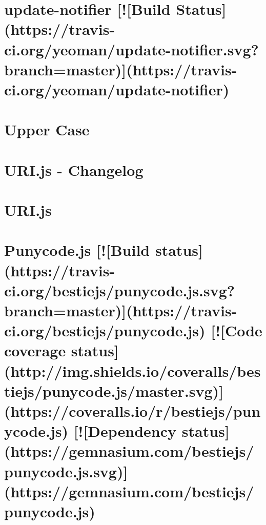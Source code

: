 \documentclass[twoside]{book}
\newcommand{\+}{\discretionary{\mbox{\scriptsize$\hookleftarrow$}}{}{}}
\begin{document}
\chapter{update-\/notifier \mbox{[}!\mbox{[}Build Status\mbox{]}(https\+://travis-\/ci.org/yeoman/update-\/notifier.svg?branch=master)\mbox{]}(https\+://travis-\/ci.org/yeoman/update-\/notifier)}
\label{md__c_1_workspace_demo_src_main_script_node_modules_update-notifier_readme}

\chapter{Upper Case}
\label{md__c_1_workspace_demo_src_main_script_node_modules_upper-case__r_e_a_d_m_e}

\chapter{U\+R\+I.\+js -\/ Changelog}
\label{md__c_1_workspace_demo_src_main_script_node_modules_urijs__c_h_a_n_g_e_l_o_g}

\chapter{U\+R\+I.\+js}
\label{md__c_1_workspace_demo_src_main_script_node_modules_urijs__r_e_a_d_m_e}

\chapter{Punycode.\+js \mbox{[}!\mbox{[}Build status\mbox{]}(https\+://travis-\/ci.org/bestiejs/punycode.js.\+svg?branch=master)\mbox{]}(https\+://travis-\/ci.org/bestiejs/punycode.js) \mbox{[}!\mbox{[}Code coverage status\mbox{]}(http\+://img.shields.\+io/coveralls/bestiejs/punycode.js/master.svg)\mbox{]}(https\+://coveralls.io/r/bestiejs/punycode.js) \mbox{[}!\mbox{[}Dependency status\mbox{]}(https\+://gemnasium.com/bestiejs/punycode.js.\+svg)\mbox{]}(https\+://gemnasium.com/bestiejs/punycode.js)}
\label{md__c_1_workspace_demo_src_main_script_node_modules_url_node_modules_punycode__r_e_a_d_m_e}

\end{document}
